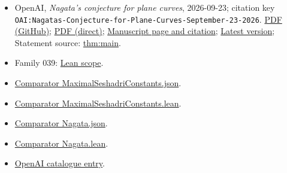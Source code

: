 \documentclass[11pt]{article}
\begin{document}
\begin{itemize}
\item OpenAI, \emph{Nagata's conjecture for plane curves}, 2026-09-23; citation key \texttt{OAI:Nagatas-Conjecture-for-Plane-Curves-September-23-2026}. \href{https://github.com/openai/math/blob/adc7f1241b42e322a6451854ab7e4b4c146bf78a/preprints/Nagatas-Conjecture-for-Plane-Curves-September-23-2026/main.pdf}{PDF (GitHub)}; \href{https://github.com/openai/math/raw/adc7f1241b42e322a6451854ab7e4b4c146bf78a/preprints/Nagatas-Conjecture-for-Plane-Curves-September-23-2026/main.pdf}{PDF (direct)}; \href{https://github.com/openai/math/blob/adc7f1241b42e322a6451854ab7e4b4c146bf78a/preprints/Nagatas-Conjecture-for-Plane-Curves-September-23-2026/README.md}{Manuscript page and citation}; \href{https://github.com/openai/math/blob/main/preprints/Nagatas-Conjecture-for-Plane-Curves-September-23-2026/main.pdf}{Latest version}; Statement source: \href{https://github.com/openai/math/blob/adc7f1241b42e322a6451854ab7e4b4c146bf78a/preprints/Nagatas-Conjecture-for-Plane-Curves-September-23-2026/build/sections/introduction.tex\#L31}{thm:main}.
\item Family 039: \href{https://github.com/openai/math/blob/adc7f1241b42e322a6451854ab7e4b4c146bf78a/lean/docs/039.md}{Lean scope}.
\item \href{https://github.com/openai/math/blob/adc7f1241b42e322a6451854ab7e4b4c146bf78a/lean/ComparatorChallenges/MaximalSeshadriConstants.json}{Comparator MaximalSeshadriConstants.json}.
\item \href{https://github.com/openai/math/blob/adc7f1241b42e322a6451854ab7e4b4c146bf78a/lean/ComparatorChallenges/MaximalSeshadriConstants.lean}{Comparator MaximalSeshadriConstants.lean}.
\item \href{https://github.com/openai/math/blob/adc7f1241b42e322a6451854ab7e4b4c146bf78a/lean/ComparatorChallenges/Nagata.json}{Comparator Nagata.json}.
\item \href{https://github.com/openai/math/blob/adc7f1241b42e322a6451854ab7e4b4c146bf78a/lean/ComparatorChallenges/Nagata.lean}{Comparator Nagata.lean}.
\item \href{https://github.com/openai/math/blob/adc7f1241b42e322a6451854ab7e4b4c146bf78a/CONTENTS.md}{OpenAI catalogue entry}.
\end{itemize}
\end{document}
